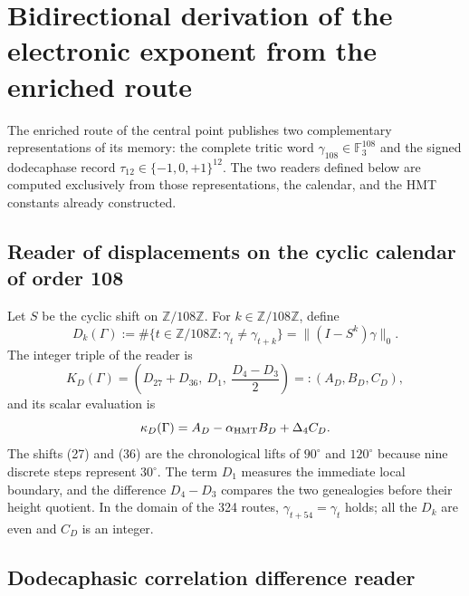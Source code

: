 \section{Bidirectional derivation of the electronic exponent from the enriched route}
\label{sec:cierre-electron-two-way-rev11}

The enriched route of the central point publishes two complementary representations
of its memory: the complete tritic word
\(\gamma_{108}\in\mathbb F_3^{108}\) and the signed dodecaphase record
\(\tau_{12}\in\{-1,0,+1\}^{12}\). The two readers defined below
are computed exclusively from those representations, the calendar, and the
HMT constants already constructed.

\subsection{Reader of displacements on the cyclic calendar of order 108}

Let \(S\) be the cyclic shift on \(\mathbb Z/108\mathbb Z\). For
\(k\in\mathbb Z/108\mathbb Z\), define
\begin{equation}
 D_k(\Gamma):=
 \#\{t\in\mathbb Z/108\mathbb Z:\gamma_t\ne\gamma_{t+k}\}
 =\lVert(I-S^k)\gamma\rVert_0.
 \label{eq:lector-dk-ct108-rev11}
\end{equation}
The integer triple of the reader is
\begin{equation}
 K_D(\Gamma)=
 \left(D_{27}+D_{36},\ D_1,\ \frac{D_4-D_3}{2}\right)
 =:(A_D,B_D,C_D),
 \label{eq:KD-rev11}
\end{equation}
and its scalar evaluation is
\begin{equation}
 \kappa_D(\Gamma)=A_D-\alpha_{\rm HMT}B_D+\Delta_4 C_D.
 \label{eq:kappaD-rev11}
\end{equation}
The shifts (27) and (36) are the chronological lifts of
\(90^\circ\) and \(120^\circ\) because nine discrete steps represent
\(30^\circ\). The term \(D_1\) measures the immediate local boundary, and the
difference \(D_4-D_3\) compares the two genealogies before their height
quotient. In the domain of the 324 routes,
\(\gamma_{t+54}=\gamma_t\) holds; all the \(D_k\) are even and \(C_D\) is an integer.

\subsection{Dodecaphasic correlation difference reader}

